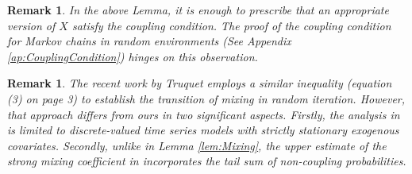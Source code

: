 \documentclass[a4paper,10pt]{article}
\newtheorem{remark}[theorem]{Remark}
\begin{document}
\begin{remark}
	In the above Lemma, it is enough to prescribe that an appropriate version of $X$ satisfy the coupling condition. The proof of the coupling condition for Markov chains in random environments (See Appendix \ref{ap:CouplingCondition}) hinges on this observation.
\end{remark}

\begin{remark}
The recent work by Truquet \cite{TRUQUET2023294} employs a similar inequality (equation (3) on page 3) to establish the transition of mixing in random iteration. However, that approach differs from ours in two significant aspects. Firstly, the analysis in \cite{TRUQUET2023294} is limited to discrete-valued time series models with strictly stationary exogenous covariates. Secondly, unlike in Lemma \ref{lem:Mixing}, the upper estimate of the strong mixing coefficient in \cite{TRUQUET2023294} incorporates the tail sum of non-coupling probabilities.
\end{remark}
\end{document}

